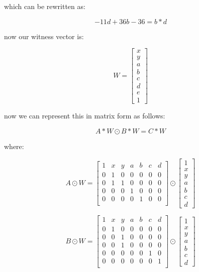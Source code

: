 \documentclass{article}
\begin{document}
which can be rewritten as:

\[
- 11d + 36b - 36 = b*d 
\]


now our witness vector is:

\[
W = \begin{bmatrix}
    x \\ y \\ a \\ b \\ c \\ d \\ e \\ 1
\end{bmatrix}
\]

now we can represent this in matrix form as follows:

\[
A*W \odot B*W = C*W
\]

where:

\[
A \odot W = \begin{bmatrix}
    1 & x & y & a & b & c & d\\
    0 & 1 & 0 & 0 & 0 & 0 & 0\\
    0 & 1 & 1 & 0 & 0 & 0 & 0\\
    0 & 0 & 0 & 1 & 0 & 0 & 0\\
    0 & 0 & 0 & 0 & 1 & 0 & 0\\
\end{bmatrix} \odot \begin{bmatrix}
    1 \\ x \\ y \\ a \\ b \\ c \\ d
\end{bmatrix}
\] 


\[
B \odot W = \begin{bmatrix}
    1 & x & y & a & b & c & d\\
    0 & 1 & 0 & 0 & 0 & 0 & 0\\
    0 & 0 & 1 & 0 & 0 & 0 & 0\\
    0 & 0 & 1 & 0 & 0 & 0 & 0\\
    0 & 0 & 0 & 0 & 0 & 1 & 0\\
    0 & 0 & 0 & 0 & 0 & 0 & 1\\
\end{bmatrix} \odot \begin{bmatrix}
    1 \\ x \\ y \\ a \\ b \\ c \\ d
\end{bmatrix}
\]
\end{document}
